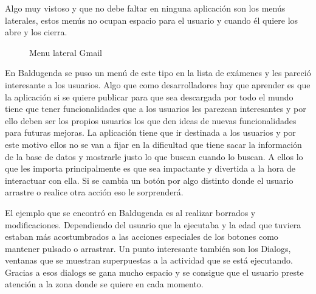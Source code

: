  
Algo muy vistoso y que no debe faltar en ninguna aplicación son los menús laterales, estos menús no ocupan espacio para el usuario y cuando él quiere los abre y los cierra.
\newpage
\begin{figure}[H] 
  \begin{center} 
    \caption{Menu lateral Gmail} 
    \label{fig:MenuLateral} 
  \end{center} 
\end{figure}

En Baldugenda se puso un menú de este tipo en la lista de exámenes y les pareció interesante a los usuarios.
Algo que como desarrolladores hay que aprender es que la aplicación si se quiere publicar para que sea descargada por todo el mundo tiene que tener funcionalidades que a los usuarios les parezcan interesantes y por ello deben ser los propios usuarios los que den ideas de nuevas funcionalidades para futuras mejoras. La aplicación tiene que ir destinada a los usuarios y por este motivo ellos no se van a fijar en la dificultad que tiene sacar la información de la base de datos y mostrarle justo lo que buscan cuando lo buscan.
A ellos lo que les importa principalmente es que sea impactante y divertida a la hora de interactuar con ella.
Si se cambia un botón por algo distinto donde el usuario arrastre o realice otra acción eso le sorprenderá.

El ejemplo que se encontró en Baldugenda es al realizar borrados y modificaciones.
Dependiendo del usuario que la ejecutaba y la edad que tuviera estaban más acostumbrados a las acciones especiales de los botones como mantener pulsado o arrastrar.
Un punto interesante también son los Dialogs, ventanas que se muestran superpuestas a la actividad que se está ejecutando. Gracias a esos dialogs se gana mucho espacio y se consigue que el usuario preste atención a la zona donde se quiere en cada momento.

